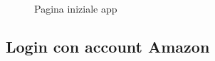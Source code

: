 \begin{figure}[!ht]
	\centering
	\caption{Pagina iniziale app}
\end{figure}

\subsection{Login con account Amazon}

